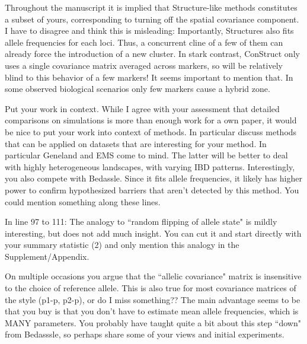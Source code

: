 \begin{point}{}
    Throughout the manuscript it is implied that Structure-like methods constitutes a subset of yours, 
 corresponding to turning off the spatial covariance component. 
 I have to disagree and think this is misleading: 
 Importantly, Structures also fits allele frequencies for each loci. 
 Thus, a concurrent cline of a few of them can already force the introduction of a new cluster. 
 In stark contrast, ConStruct only uses a single covariance matrix averaged across markers, 
 so will be relatively blind to this behavior of a few markers! 
 It seems important to mention that. 
 In some observed biological scenarios only few markers cause a hybrid zone.
\end{point}


\begin{point}{}
    Put your work in context. 
 While I agree with your assessment that detailed comparisons on simulations is more than enough work for a own paper, 
 it would be nice to put your work into context of methods. 
 In particular discuss methods that can be applied on datasets that are interesting for your method. 
 In particular Geneland and EMS come to mind. 
 The latter will be better to deal with highly heterogeneous landscapes, with varying IBD patterns.
Interestingly, you also compete with Bedassle. 
Since it fits allele frequencies, it likely has higher power to confirm 
hypothesized barriers that aren't detected by this method. 
You could mention something along these lines.
\end{point}


\begin{point}{}
    In line 97 to 111: The analogy to ``random flipping of allele state" is mildly interesting, 
but does not add much insight. 
You can cut it and start directly with your summary statistic (2) and only mention this analogy in the Supplement/Appendix.
\end{point}


\begin{point}{}
    On multiple occasions you argue that the ``allelic covariance" matrix is insensitive to the choice of reference allele. 
This is also true for most covariance matrices of the style (p1-p, p2-p), or do I miss something??
The main advantage seems to be that you buy is that you don't have to estimate mean allele frequencies, which is MANY parameters. 
You probably have taught quite a bit about this step ``down" from Bedasssle, so perhaps share some of your views and initial experiments.
\end{point}

